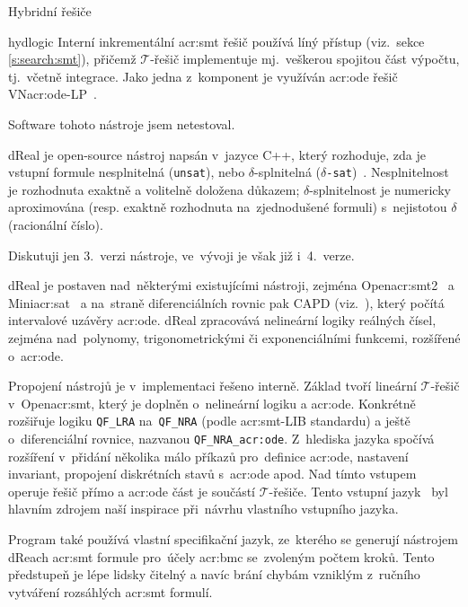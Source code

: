 \documentclass[thesis=M,czech]{FITthesis}[2012/06/26]
\newcommand{\acrlabel}[1]{acr:#1}
\newcommand{\acr}[1]{\acrshort{\acrlabel{#1}}}
\newcommand{\id}[1]{\texttt{#1}}
\newcommand{\cit}[1]{\cite{#1}}
\newcommand{\rf}[1]{\ref{#1}}
\newcommand{\set}[1]{\ensuremath{\mathcal{#1}}}
\begin{document}
\begin{section}{Hybridní řešiče}
\begin{paragraph}{hydlogic}
Interní inkrementální \acr{smt} řešič používá líný přístup
(viz.~sekce \rf{s:search:smt}),
přičemž \set{T}-řešič implementuje
mj.~veškerou spojitou část výpočtu,
tj.~včetně integrace.
Jako jedna z~komponent
je využíván \acr{ode} řešič VN\acr{ode}-LP~\cit{vnode-lp}.

Software tohoto nástroje jsem netestoval.
\end{paragraph} %


\begin{paragraph}{dReal}\label{p:search:hybrid:dreal}
je open-source nástroj napsán v~jazyce C++, který rozhoduje,
zda je vstupní formule nesplnitelná (\id{unsat}),
nebo $\delta$-splnitelná
(\id{$\delta$-sat})~\cit{dreal-art}\cit{dreal-smo-art}\cit{dreal}.
Nesplnitelnost je rozhodnuta exaktně a volitelně doložena důkazem;
$\delta$-splnitelnost je numericky aproximována
(resp. exaktně rozhodnuta na~zjednodušené formuli)
s~nejistotou $\delta$ (racionální číslo).

Diskutuji jen 3.~verzi nástroje,
ve~vývoji je však již i~4.~verze.

dReal je postaven nad~některými existujícími nástroji,
zejména Open\acr{smt}2~\cit{opensmt} a Mini\acr{sat}~\cit{minisat}
a na~straně diferenciálních rovnic pak CAPD
(viz.~\cit{dreal-smo-art}\cit{dreal-smt-format-art}),
který počítá intervalové uzávěry \acr{ode}.
dReal zpracovává nelineární logiky
reálných čísel, zejména nad~polynomy,
trigonometrickými či exponenciálními funkcemi,
rozšířené o~\acr{ode}.

Propojení nástrojů je v~implementaci řešeno interně.
Základ tvoří lineární \set{T}-řešič v~Open\acr{smt},
který je doplněn o~nelineární logiku a \acr{ode}.
Konkrétně rozšiřuje logiku \id{QF\_\-LRA}
na~\id{QF\_\-NRA} (podle \acr{smt}-LIB standardu) a ještě
o~diferenciální rovnice, nazvanou \id{QF\_\-NRA\_\-\acr{ode}}.
Z~hlediska jazyka spočívá rozšíření v~přidání několika málo příkazů
pro~definice \acr{ode}, nastavení invariant,
propojení diskrétních stavů s~\acr{ode} apod.
Nad tímto vstupem operuje řešič přímo
a \acr{ode} část je součástí \set{T}-řešiče.
Tento vstupní jazyk~\cit{dreal-smt-format-art}
byl hlavním zdrojem naší inspirace
při~návrhu vlastního vstupního jazyka.

Program také používá vlastní specifikační jazyk,
ze~kterého se generují nástrojem dReach \acr{smt} formule
pro~účely \acr{bmc} se~zvoleným počtem kroků.
Tento předstupeň je lépe lidsky čitelný
a navíc brání chybám
vzniklým z~ručního vytváření rozsáhlých \acr{smt} formulí.


\end{paragraph}
\end{section}
\end{document}
